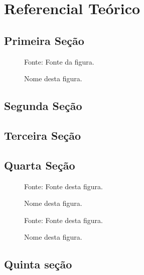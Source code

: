 \chapter{Referencial Teórico}

\section{Primeira Seção}
\lipsum[1-4]

	\begin{figure}[!ht]
		\centering
		\caption{Nome desta figura.}
		\fbox{\rule[5cm]{\textwidth}{0cm}}
		\begin{minipage}{\textwidth}
			\centering
			{\small Fonte: Fonte da figura.}\par
		\end{minipage}
		\label{fig:irradiacao}
	\end{figure}
	
\section{Segunda Seção}
\lipsum[5-8]

\section{Terceira Seção}
\lipsum[9-10]
	
\section{Quarta Seção}
\lipsum[11]
	
	\begin{figure}[!ht]
		\centering
		\caption{Nome desta figura.}
		\fbox{\rule[6cm]{\textwidth}{0cm}}
		\begin{minipage}{\textwidth}
			\centering
			{\small Fonte: Fonte desta figura.}\par
		\end{minipage}
		\label{fig:aquecedor1}
	\end{figure}
	
\lipsum[12]
	
	\begin{figure}[!ht]
		\centering
		\caption{Nome desta figura.}
		\fbox{\rule[5cm]{\textwidth}{0cm}}
		\begin{minipage}{\textwidth}
			\centering
			{\small Fonte: Fonte desta figura.}\par
		\end{minipage}
		\label{fig:aquecedor2}
	\end{figure}
	
\lipsum[13]
	
\section{Quinta seção}
\lipsum[14-17]